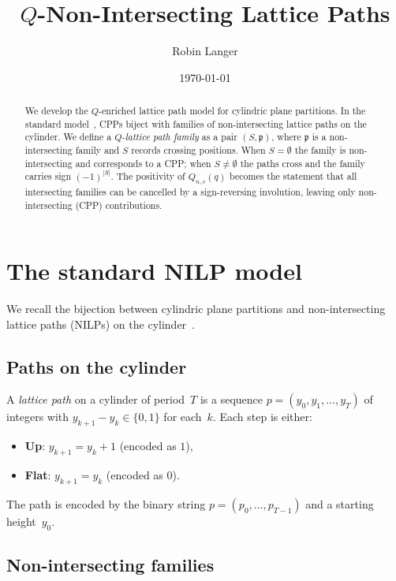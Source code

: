 \documentclass[11pt]{article}
\title{$Q$-Non-Intersecting Lattice Paths}
\author{Robin Langer}
\date{\today}
\theoremstyle{plain}
\theoremstyle{definition}
\begin{document}
\maketitle

\begin{abstract}
We develop the $Q$-enriched lattice path model for cylindric
plane partitions.  In the standard model~\cite{langer-thesis},
CPPs biject with families of non-intersecting lattice paths
on the cylinder.  We define a \emph{$Q$-lattice path family}
as a pair $(S, \mathfrak{p})$, where $\mathfrak{p}$ is a
non-intersecting family and $S$ records crossing positions.
When $S = \emptyset$ the family is non-intersecting and
corresponds to a CPP; when $S \neq \emptyset$ the paths
cross and the family carries sign $(-1)^{|S|}$.
The positivity of $Q_{n,c}(q)$ becomes the statement that
all intersecting families can be cancelled by a
sign-reversing involution, leaving only non-intersecting
(CPP) contributions.
\end{abstract}

\tableofcontents


\section{The standard NILP model}
\label{sec:standard}

We recall the bijection between cylindric plane partitions and
non-intersecting lattice paths (NILPs) on the
cylinder~\cite{langer-thesis}.

\subsection{Paths on the cylinder}

A \emph{lattice path} on a cylinder of period~$T$ is a
sequence $p = (y_0, y_1, \ldots, y_T)$ of integers with
$y_{k+1} - y_k \in \{0, 1\}$ for each~$k$.  Each step is
either:
\begin{itemize}
  \item \textbf{Up}: $y_{k+1} = y_k + 1$ (encoded as $1$),
  \item \textbf{Flat}: $y_{k+1} = y_k$ (encoded as $0$).
\end{itemize}
The path is encoded by the binary string
$p = (p_0, \ldots, p_{T-1})$ and a starting height~$y_0$.


\subsection{Non-intersecting families}
\end{document}
